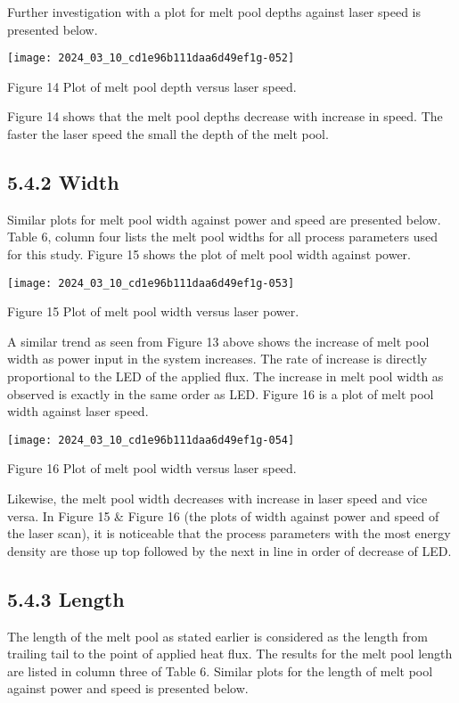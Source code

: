 \documentclass[10pt]{article}
\begin{document}
Further investigation with a plot for melt pool depths against laser speed is presented below.

\begin{center}
\texttt{[image: 2024\_03\_10\_cd1e96b111daa6d49ef1g-052]}
\end{center}

Figure 14 Plot of melt pool depth versus laser speed.

Figure 14 shows that the melt pool depths decrease with increase in speed. The faster the laser speed the small the depth of the melt pool.

\subsection*{5.4.2 Width}
Similar plots for melt pool width against power and speed are presented below. Table 6, column four lists the melt pool widths for all process parameters used for this study. Figure 15 shows the plot of melt pool width against power.

\begin{center}
\texttt{[image: 2024\_03\_10\_cd1e96b111daa6d49ef1g-053]}
\end{center}

Figure 15 Plot of melt pool width versus laser power.

A similar trend as seen from Figure 13 above shows the increase of melt pool width as power input in the system increases. The rate of increase is directly proportional to the LED of the applied flux. The increase in melt pool width as observed is exactly in the same order as LED. Figure 16 is a plot of melt pool width against laser speed.

\begin{center}
\texttt{[image: 2024\_03\_10\_cd1e96b111daa6d49ef1g-054]}
\end{center}

Figure 16 Plot of melt pool width versus laser speed.

Likewise, the melt pool width decreases with increase in laser speed and vice versa. In Figure 15 \& Figure 16 (the plots of width against power and speed of the laser scan), it is noticeable that the process parameters with the most energy density are those up top followed by the next in line in order of decrease of LED.

\subsection*{5.4.3 Length}
The length of the melt pool as stated earlier is considered as the length from trailing tail to the point of applied heat flux. The results for the melt pool length are listed in column three of Table 6. Similar plots for the length of melt pool against power and speed is presented below.
\end{document}
